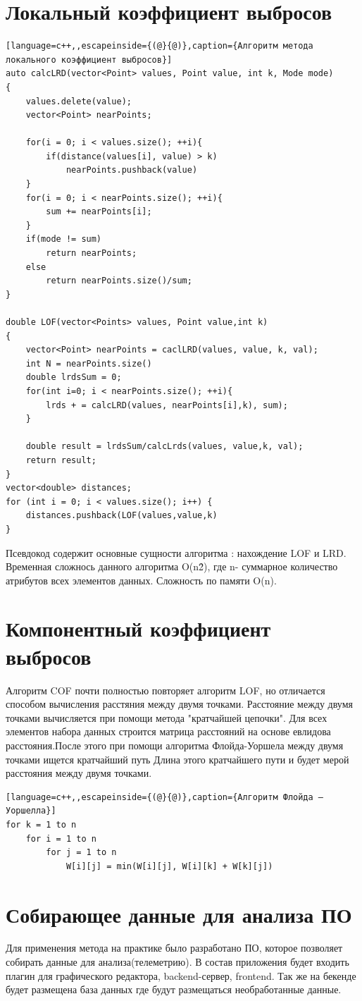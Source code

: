 \section{Локальный коэффициент выбросов}
\begin{lstlisting}[language=c++,,escapeinside={(@}{@)},caption={Алгоритм метода локального коэффициент выбросов}] 
auto calcLRD(vector<Point> values, Point value, int k, Mode mode)
{
	values.delete(value);
	vector<Point> nearPoints;
	
	for(i = 0; i < values.size(); ++i){
		if(distance(values[i], value) > k)
			nearPoints.pushback(value)
	}
	for(i = 0; i < nearPoints.size(); ++i){
		sum += nearPoints[i];
	}
	if(mode != sum)
		return nearPoints;
	else 
		return nearPoints.size()/sum;
}

double LOF(vector<Points> values, Point value,int k)
{
    vector<Point> nearPoints = caclLRD(values, value, k, val);
    int N = nearPoints.size()
    double lrdsSum = 0;
	for(int i=0; i < nearPoints.size(); ++i){
		lrds + = calcLRD(values, nearPoints[i],k), sum);
	}
	
	double result = lrdsSum/calcLrds(values, value,k, val);
	return result;		
}
vector<double> distances;
for (int i = 0; i < values.size(); i++) {
	distances.pushback(LOF(values,value,k)
}
\end{lstlisting}
Псевдокод содержит основные сущности алгоритма : нахождение LOF и LRD. Временная сложнось данного алгоритма O(n\^2), где n- суммарное количество атрибутов всех элементов данных. Сложность по памяти O(n).
\section{Компонентный коэффициент выбросов}
Алгоритм COF почти полностью повторяет алгоритм LOF, но отличается способом вычисления расстяния между двумя точками. Расстояние между двумя точками вычисляется при помощи метода "кратчайшей цепочки". Для всех  элементов набора данных строится матрица расстояний на основе евлидова расстояния.После этого при помощи алгоритма Флойда-Уоршела между двумя точками ищется кратчайший путь Длина этого кратчайшего пути и будет мерой расстояния между двумя точками. 

\begin{lstlisting}[language=c++,,escapeinside={(@}{@)},caption={Алгоритм Флойда — Уоршелла}] 
for k = 1 to n
	for i = 1 to n
		for j = 1 to n
			W[i][j] = min(W[i][j], W[i][k] + W[k][j])
\end{lstlisting}
\section{Собирающее данные для анализа ПО}
Для применения метода на практике было разработано ПО, которое позволяет собирать данные для анализа(телеметрию). В состав приложения будет входить плагин для графического редактора, backend-сервер, frontend. Так же на бекенде будет размещена база данных где будут размещаться необработанные данные.
 
